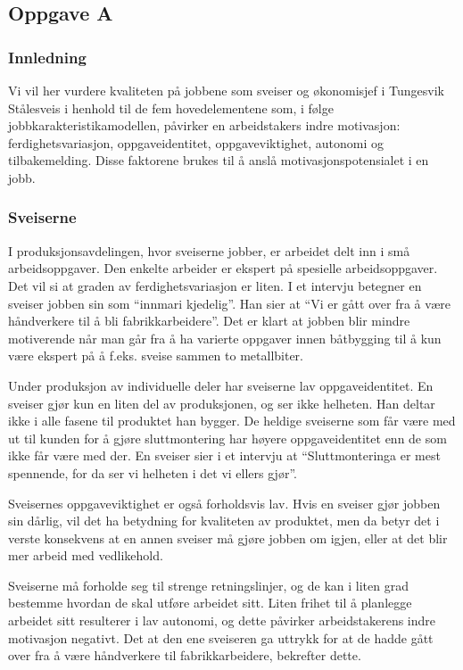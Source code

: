 

\subsection{Oppgave A}
\subsubsection{Innledning}
Vi vil her vurdere kvaliteten på jobbene som sveiser og økonomisjef i Tungesvik Stålesveis i henhold til de fem hovedelementene som, i følge jobbkarakteristikamodellen, påvirker en arbeidstakers indre motivasjon: ferdighetsvariasjon, oppgaveidentitet, oppgaveviktighet, autonomi og tilbakemelding. Disse faktorene brukes til å anslå motivasjonspotensialet i en jobb.

\subsubsection{Sveiserne}
I produksjonsavdelingen, hvor sveiserne jobber, er arbeidet delt inn i små arbeidsoppgaver. Den enkelte arbeider er ekspert på spesielle arbeidsoppgaver. Det vil si at graden av ferdighetsvariasjon er liten. I et intervju betegner en sveiser jobben sin som “innmari kjedelig”. Han sier at “Vi er gått over fra å være håndverkere til å bli fabrikkarbeidere”. Det er klart at jobben blir mindre motiverende når man går fra å ha varierte oppgaver innen båtbygging til å kun være ekspert på å f.eks. sveise sammen to metallbiter.

Under produksjon av individuelle deler har sveiserne lav oppgaveidentitet. En sveiser gjør kun en liten del av produksjonen, og ser ikke helheten. Han deltar ikke i alle fasene til produktet han bygger. De heldige sveiserne som får være med ut til kunden for å gjøre sluttmontering har høyere oppgaveidentitet enn de som ikke får være med der. En sveiser sier i et intervju at “Sluttmonteringa er mest spennende, for da ser vi helheten i det vi ellers gjør”.

Sveisernes oppgaveviktighet er også forholdsvis lav. Hvis en sveiser gjør jobben sin dårlig, vil det ha betydning for kvaliteten av produktet, men da betyr det i verste konsekvens at en annen sveiser må gjøre jobben om igjen, eller at det blir mer arbeid med vedlikehold.

Sveiserne må forholde seg til strenge retningslinjer, og de kan i liten grad bestemme hvordan de skal utføre arbeidet sitt. Liten frihet til å planlegge arbeidet sitt resulterer i lav autonomi, og dette påvirker arbeidstakerens indre motivasjon negativt. Det at den ene sveiseren ga uttrykk for at de hadde gått over fra å være håndverkere til fabrikkarbeidere, bekrefter dette.

